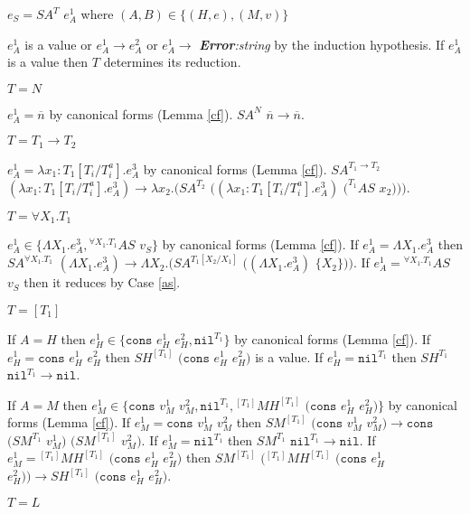 \begin{case}
$e_{S}=SA^{T}$ $e_{A}^{1}$ where $(A,B)\in\lbrace(H,e),(M,v)\rbrace$

$e_{A}^{1}$ is a value or $e_{A}^{1}\rightarrow e_{A}^{2}$ or $e_{A}^{1}\rightarrow$ \emph{\textbf{Error}:\;string} by the induction hypothesis.  If $e_{A}^{1}$ is a value then $T$ determines its reduction.
\begin{subcase}
$T=N$

$e_{A}^{1}=\overline{n}$ by canonical forms (Lemma \ref{cf}).  $SA^{N}$ $\overline{n}\rightarrow\overline{n}$.
\end{subcase}
\begin{subcase}
$T=T_{1}\rightarrow T_{2}$

$e_{A}^{1}=\lambda x_{1}:T_{1}[T_{i}/T_{i}^{a}].e_{A}^{3}$ by canonical forms (Lemma \ref{cf}).  $SA^{T_{1}\rightarrow T_{2}}$ $(\lambda x_{1}:T_{1}[T_{i}/T_{i}^{a}].e_{A}^{3})\rightarrow\lambda x_{2}.(SA^{T_{2}}$ $((\lambda x_{1}:T_{1}[T_{i}/T_{i}^{a}].e_{A}^{3})$ $(^{T_{1}}AS$ $x_{2})))$.
\end{subcase}
\begin{subcase}
$T=\forall X_{1}.T_{1}$

$e_{A}^{1}\in\lbrace\Lambda X_{1}.e_{A}^{3},{^{\forall X_{1}.T_{1}}A}S$ $v_{S}\rbrace$ by canonical forms (Lemma \ref{cf}).  If $e_{A}^{1}=\Lambda X_{1}.e_{A}^{3}$ then $SA^{\forall X_{1}.T_{1}}$ $(\Lambda X_{1}.e_{A}^{3})\rightarrow\Lambda X_{2}.(SA^{T_{1}[X_{2}/X_{1}]}$ $((\Lambda X_{1}.e_{A}^{3})$ $\lbrace X_{2}\rbrace))$.  If $e_{A}^{1}={^{\forall X_{1}.T_{1}}A}S$ $v_{S}$ then it reduces by Case \ref{as}.
\end{subcase}
\begin{subcase}
$T=[T_{1}]$

If $A=H$ then $e_{H}^{1}\in\lbrace\mathtt{cons}$ $e_{H}^{1}$ $e_{H}^{2},\mathtt{nil}^{T_{1}}\rbrace$ by canonical forms (Lemma \ref{cf}).  If $e_{H}^{1}=\mathtt{cons}$ $e_{H}^{1}$ $e_{H}^{2}$ then $SH^{[T_{1}]}$ $(\mathtt{cons}$ $e_{H}^{1}$ $e_{H}^{2})$ is a value.  If $e_{H}^{1}=\mathtt{nil}^{T_{1}}$ then $SH^{T_{1}}$ $\mathtt{nil}^{T_{1}}\rightarrow\mathtt{nil}$.

If $A=M$ then $e_{M}^{1}\in\lbrace\mathtt{cons}$ $v_{M}^{1}$ $v_{M}^{2},\mathtt{nil}^{T_{1}},{^{[T_{1}]}M}H^{[T_{1}]}$ $(\mathtt{cons}$ $e_{H}^{1}$ $e_{H}^{2})\rbrace$ by canonical forms (Lemma \ref{cf}).  If $e_{M}^{1}=\mathtt{cons}$ $v_{M}^{1}$ $v_{M}^{2}$ then $SM^{[T_{1}]}$ $(\mathtt{cons}$ $v_{M}^{1}$ $v_{M}^{2})\rightarrow\mathtt{cons}$ $(SM^{T_{1}}$ $v_{M}^{1})$ $(SM^{[T_{1}]}$ $v_{M}^{2})$.  If $e_{M}^{1}=\mathtt{nil}^{T_{1}}$ then $SM^{T_{1}}$ $\mathtt{nil}^{T_{1}}\rightarrow\mathtt{nil}$.  If $e_{M}^{1}={^{[T_{1}]}M}H^{[T_{1}]}$ $(\mathtt{cons}$ $e_{H}^{1}$ $e_{H}^{2})$ then $SM^{[T_{1}]}$ $({^{[T_{1}]}M}H^{[T_{1}]}$ $(\mathtt{cons}$ $e_{H}^{1}$ $e_{H}^{2}))\rightarrow SH^{[T_{1}]}$ $(\mathtt{cons}$ $e_{H}^{1}$ $e_{H}^{2})$.
\end{subcase}
\begin{subcase}
$T=L$


\end{subcase}
\end{case}
